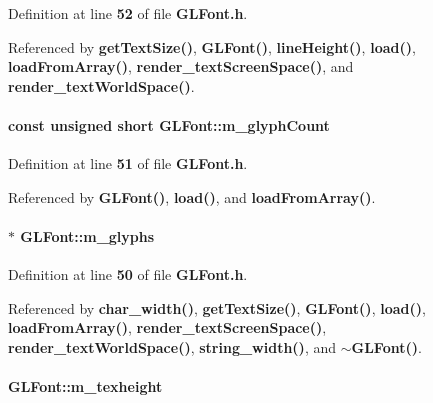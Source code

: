 Definition at line {\bf 52} of file {\bf G\+L\+Font.\+h}.



Referenced by {\bf get\+Text\+Size()}, {\bf G\+L\+Font()}, {\bf line\+Height()}, {\bf load()}, {\bf load\+From\+Array()}, {\bf render\+\_\+text\+Screen\+Space()}, and {\bf render\+\_\+text\+World\+Space()}.

\paragraph[{m\+\_\+glyph\+Count}]{\setlength{\rightskip}{0pt plus 5cm}const unsigned short G\+L\+Font\+::m\+\_\+glyph\+Count}\label{classGLFont_a25fc1930f794e4946f099d69f34f8314}


Definition at line {\bf 51} of file {\bf G\+L\+Font.\+h}.



Referenced by {\bf G\+L\+Font()}, {\bf load()}, and {\bf load\+From\+Array()}.

\paragraph[{m\+\_\+glyphs}]{$\ast$ G\+L\+Font\+::m\+\_\+glyphs}\label{classGLFont_a6354a1f47805f898eaeb85dea6168da2}


Definition at line {\bf 50} of file {\bf G\+L\+Font.\+h}.



Referenced by {\bf char\+\_\+width()}, {\bf get\+Text\+Size()}, {\bf G\+L\+Font()}, {\bf load()}, {\bf load\+From\+Array()}, {\bf render\+\_\+text\+Screen\+Space()}, {\bf render\+\_\+text\+World\+Space()}, {\bf string\+\_\+width()}, and {\bf $\sim$\+G\+L\+Font()}.

\paragraph[{m\+\_\+texheight}]{ G\+L\+Font\+::m\+\_\+texheight}\label{classGLFont_a315fb89a9230f4419c9eb72303548466}


